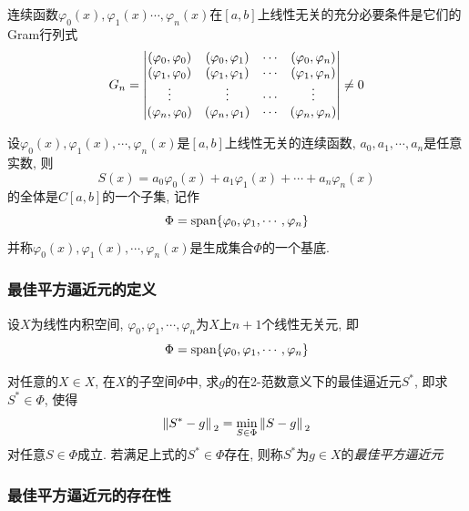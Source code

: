 \begin{theorem} %
    连续函数$\varphi_0(x),\varphi_1(x)\cdots,\varphi_n(x)$在$[a,b]$上线性无关的充分必要条件是它们的Gram行列式
    \begin{equation*}
        G_n=
        \mqty|(\varphi_0,\varphi_0)&(\varphi_0,\varphi_1)&\cdots&(\varphi_0,\varphi_n)\\
        (\varphi_1,\varphi_0)&(\varphi_1,\varphi_1)&\cdots&(\varphi_1,\varphi_n)\\
        \vdots&\vdots&\cdots&\vdots\\
        (\varphi_n,\varphi_0)&(\varphi_n,\varphi_1)&\cdots&(\varphi_n,\varphi_n)|\ne 0
        \end{equation*}
\end{theorem}

设$\varphi_0(x),\varphi_1(x),\cdots,\varphi_n(x)$是$[a,b]$上线性无关的连续函数, $a_0,a_1,\cdots,a_n$是任意实数, 则
\begin{equation*}
    S(x)=a_0\varphi_0(x)+a_1\varphi_1(x)+\cdots+a_n\varphi_n(x)
\end{equation*}
的全体是$C[a,b]$的一个子集, 记作
\begin{equation*}
    \Phi=\text{span}\{\varphi_0,\varphi_1,\cdots,\varphi_n\}
\end{equation*}
并称$\varphi_0(x),\varphi_1(x),\cdots,\varphi_n(x)$是生成集合$\Phi$的一个基底.

\subsubsection{最佳平方逼近元的定义}

设$X$为线性内积空间, $\varphi_0,\varphi_1,\cdots,\varphi_n$为$X$上$n+1$个线性无关元, 即
\begin{equation*}
    \Phi=\text{span}\{\varphi_0,\varphi_1,\cdots,\varphi_n\}
\end{equation*}

\begin{definition}[最佳平方逼近元]
    对任意的$X\in X$, 在$X$的子空间$\Phi$中, 求$g$的在2-范数意义下的最佳逼近元$S^*$, 即求$S^*\in\Phi$, 使得
    \begin{equation*}
        \norm*{S^*-g}_2=\min_{S\in\Phi}\norm*{S-g}_2
    \end{equation*}
    对任意$S\in\Phi$成立. 若满足上式的$S^*\in\Phi$存在, 则称$S^*$为$g\in X$的\emph{最佳平方逼近元}
\end{definition}

\subsubsection{最佳平方逼近元的存在性}

